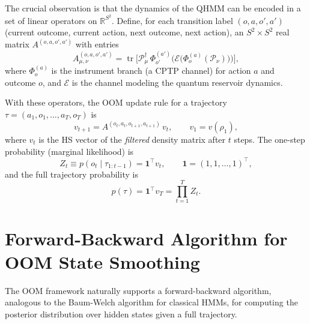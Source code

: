 The crucial observation is that the dynamics of the QHMM can be encoded
in a set of linear operators on $\mathbb{R}^{S^2}$. Define, for each
transition label $(o, a, o', a')$ (current outcome, current action, next
outcome, next action), an $S^2 \times S^2$ real matrix $A^{(o,a,o',a')}$
with entries
\begin{equation}
A^{(o,a,o',a')}_{\mu,\nu}
  = \operatorname{tr}\!\bigl[ \mathcal{P}_\mu^\dagger \,
    \Phi^{(a')}_{o'} \!\bigl( \mathcal{E}\bigl(
      \Phi^{(a)}_o(\mathcal{P}_\nu) \bigr) \bigr) \bigr],
\label{eq:oom_A_def}
\end{equation}
where $\Phi^{(a)}_o$ is the instrument branch (a CPTP channel) for
action $a$ and outcome $o$, and $\mathcal{E}$ is the channel modeling the
quantum reservoir dynamics.

With these operators, the OOM update rule for a trajectory
$\tau = (a_1, o_1, \ldots, a_T, o_T)$ is
\begin{equation}
v_{t+1} = A^{(o_t, a_t, o_{t+1}, a_{t+1})} \, v_t,
\qquad v_1 = v(\rho_1),
\label{eq:oom_update}
\end{equation}
where $v_t$ is the HS vector of the \emph{filtered} density matrix after
$t$ steps. The one-step probability (marginal likelihood) is
\begin{equation}
Z_t \equiv p(o_t \mid \tau_{1:t-1}) = \mathbf{1}^\top v_t,
\qquad \mathbf{1} = (1, 1, \ldots, 1)^\top,
\label{eq:oom_marginal}
\end{equation}
and the full trajectory probability is
\begin{equation}
p(\tau) = \mathbf{1}^\top v_T = \prod_{t=1}^T Z_t.
\label{eq:oom_trajectory}
\end{equation}



\section{Forward-Backward Algorithm for OOM State Smoothing}
\label{sec:forward_backward}

The OOM framework naturally supports a forward-backward algorithm,
analogous to the Baum-Welch algorithm for classical HMMs, for computing
the posterior distribution over hidden states given a full trajectory.

